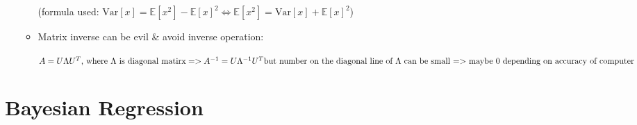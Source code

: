 \begin{itemize}
\begin{itemize}
	(formula used: $\text{Var}[x] = \mathbb E[x^2] - \mathbb E[x]^2 \Leftrightarrow \mathbb E[x^2] = \text{Var}[x]+ \mathbb E[x]^2$) 
	
	\item Matrix inverse can be evil \& avoid inverse operation: 
	
	$A = U\Lambda U^T  \text{, where $\Lambda$ is diagonal matirx} \\ => A^{-1} = U\Lambda^{-1}U^T \\ \text {but number on the diagonal line of $\Lambda$ can be small => maybe 0 depending on accuracy of computer}$ 
	\end{itemize}


\end{itemize}


\section{Bayesian Regression}

